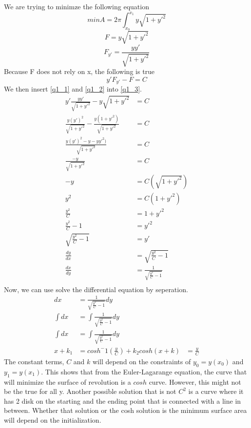 We are trying to minimze the following equation
\begin{equation}
min A =  2 \pi \int_{x_0}^{x_1} y \sqrt{1 + y'^2}
\end{equation}
\begin{equation}\label{q1_1}
F =  y \sqrt{1 + y'^2}
\end{equation}
\begin{equation}\label{q1_2}
F_{y'} = \frac{yy'}{\sqrt{1 + y'^2}}
\end{equation}
Because F does not rely on x, the following is true
\begin{equation}\label{q1_3}
y'F_{y'} - F = C
\end{equation}
We then insert \ref{q1_1} and \ref{q1_2} into \ref{q1_3}.
\begin{equation}
\begin{aligned}
y'\frac{yy'}{\sqrt{1 + y'^2}} - y \sqrt{1 + y'^2} &= C\\
\frac{y(y')^2}{\sqrt{1 + y'^2}} - \frac{y(1 + y'^2)}{\sqrt{1 + y'^2}} &= C\\
\frac{y(y')^2 - y - yy'^2)}{\sqrt{1 + y'^2}} &= C\\
\frac{-y}{\sqrt{1 + y'^2}} &= C\\
-y &= C (\sqrt{1 + y'^2}) \\
y^2 &= C (1 + y'^2)\\
\frac{y^2}{C} &= 1 + y'^2\\
\frac{y^2}{C} - 1 &= y'^2\\
\sqrt{\frac{y^2}{C} - 1} &= y'\\
\frac{dy}{dx} &= \sqrt{\frac{y^2}{C} - 1}\\
\frac{dx}{dy} &= \frac{1}{\sqrt{\frac{y^2}{C} - 1}}\\
\end{aligned}
\end{equation}
Now, we can use solve the differential equation by seperation.
\begin{equation}
\begin{aligned}
dx &= \frac{1}{\sqrt{\frac{y^2}{C} - 1}} dy\\
\int dx &= \int \frac{1}{\sqrt{\frac{y^2}{C} - 1}} dy\\
\int dx &= \int \frac{1}{\sqrt{\frac{y^2}{C} - 1}} dy\\
x + k_1 &= cosh^-1(\frac{y}{C}) + k_2
cosh(x + k) &= \frac{y}{C}
\end{aligned}
\end{equation}
The constant terms, $C$ and $k$ will depend on the constraints of $y_0 = y(x_0)$ and $y_1 = y(x_1)$. This shows that from the Euler-Lagarange equation, the curve that will minimize the surface of revolution is a $cosh$ curve. However, this might not be the true for all y. Another possible solution that is not $C^2$ is a curve where it has 2 disk on the starting and the ending point that is connected with a line in between. Whether that solution or the cosh solution is the minimum surface area will depend on the initialization.

